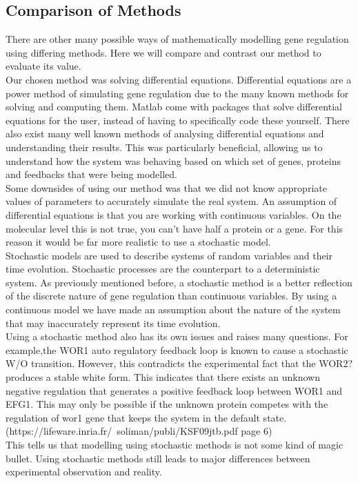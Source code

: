 \documentclass[]{article}
\begin{document}
\subsection{Comparison of Methods}

There are other many possible ways of mathematically modelling gene regulation using differing methods. Here we will compare and contrast our method to evaluate its value.
\\
Our chosen method was solving differential equations. Differential equations are a power method of simulating gene regulation due to the many known methods for solving and computing them. Matlab come with packages that solve differential equations for the user, instead of having to specifically code these yourself. There also exist many well known methods of analysing differential equations and understanding their results. This was particularly beneficial, allowing us to understand how the system was behaving based on which set of genes, proteins and feedbacks that were being modelled.
\\
Some downsides of using our method was that we did not know appropriate values of parameters to accurately simulate the real system. An assumption of differential equations is that you are working with continuous variables. On the molecular level this is not true, you can't have half a protein or a gene. For this reason it would be far more realistic to use a stochastic model. 
\\
Stochastic models are used to describe systems of random variables and their time evolution.  Stochastic processes are the counterpart to a deterministic system. As previously mentioned before, a stochastic method is a better reflection of the discrete nature of gene regulation than continuous variables. By using a continuous model we have made an assumption about the nature of the system that may inaccurately represent its time evolution.
\\
Using a stochastic method also has its own issues and raises many questions. For example,the WOR1 auto regulatory feedback loop is known to cause a stochastic W/O transition. However, this contradicts the experimental fact that the WOR2? produces a stable white form.  This indicates that there exists an unknown negative regulation that generates a positive feedback loop between WOR1 and EFG1. This may only be possible if the unknown protein competes with the regulation of wor1 gene that keeps the system in the default state. (https://lifeware.inria.fr/~soliman/publi/KSF09jtb.pdf page 6)
\\
This tells us that modelling using stochastic methods is not some kind of magic bullet. Using stochastic methods still leads to major differences between experimental observation and reality.
\end{document}
